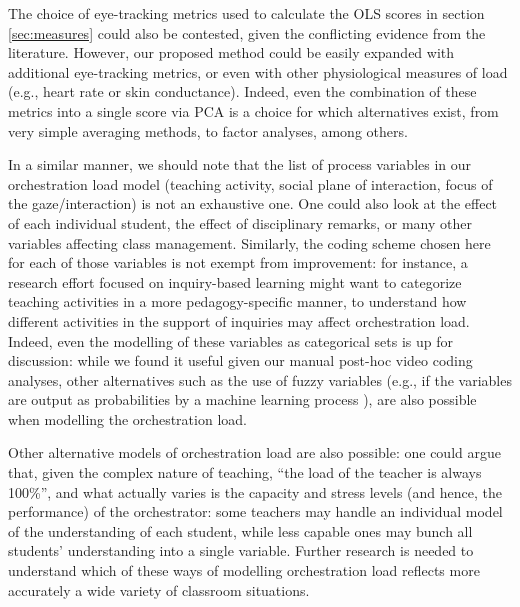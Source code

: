 \documentclass[10pt,journal,compsoc]{IEEEtran}
\begin{document}
The choice of eye-tracking metrics used to calculate the OLS scores in section \ref{sec:measures} could also be contested, given the conflicting evidence from the literature. However, our proposed method could be easily expanded with additional eye-tracking metrics, or even with other physiological measures of load (e.g., heart rate or skin conductance). Indeed, even the combination of these metrics into a single score via PCA is a choice for which alternatives exist, from very simple averaging methods, to factor analyses, among others.

In a similar manner, we should note that the list of process variables in our orchestration load model (teaching activity, social plane of interaction, focus of the gaze/interaction) is not an exhaustive one. One could also look at the effect of each individual student, the effect of disciplinary remarks, or many other variables affecting class management. Similarly, the coding scheme chosen here for each of those variables is not exempt from improvement: for instance, a research effort focused on inquiry-based learning might want to categorize teaching activities in a more pedagogy-specific manner, to understand how different activities in the support of inquiries may affect orchestration load. Indeed, even the modelling of these variables as categorical sets is up for discussion: while we found it useful given our manual post-hoc video coding analyses, other alternatives such as the use of fuzzy variables (e.g., if the variables are output as probabilities by a machine learning process \cite{prieto2016teaching}), are also possible when modelling the orchestration load. 

Other alternative models of orchestration load are also possible: one could argue that, given the complex nature of teaching, ``the load of the teacher is always 100\%'', and what actually varies is the capacity and stress levels (and hence, the performance) of the orchestrator: some teachers may handle an individual model of the understanding of each student, while less capable ones may bunch all students' understanding into a single variable. Further research is needed to understand which of these ways of modelling orchestration load reflects more accurately a wide variety of classroom situations.

\end{document}
